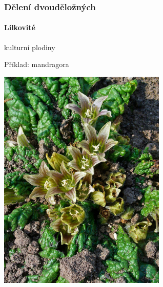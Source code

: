 \documentclass{beamer}
\begin{document}
\begin{frame}
\frametitle{Dělení dvouděložných}
	\framesubtitle{Lilkovité}kulturní plodiny

Příklad: mandragora

\begin{center}\includegraphics[width=8cm]{Mandragora_officinarum_002.jpg}\end{center}
\end{frame}
\end{document}
